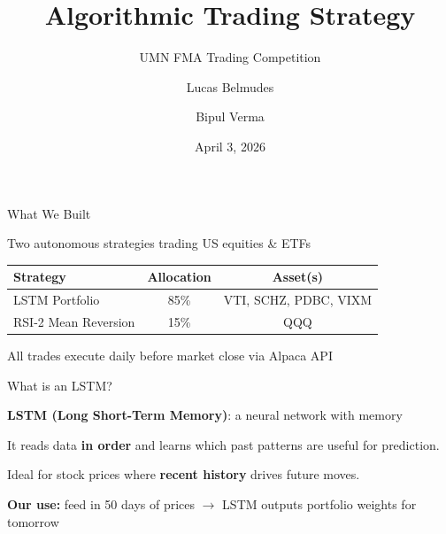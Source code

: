 \documentclass[aspectratio=169]{beamer}
\title{Algorithmic Trading Strategy}
\subtitle{UMN FMA Trading Competition}
\author{Lucas Belmudes \and Bipul Verma}
\date{April 3, 2026}
\begin{document}
\begin{frame}
\titlepage
\end{frame}

\begin{frame}{What We Built}

\Large
Two autonomous strategies trading US equities \& ETFs

\vspace{0.5cm}

\begin{table}
\centering
\large
\begin{tabular}{lcc}
\toprule
\textbf{Strategy} & \textbf{Allocation} & \textbf{Asset(s)} \\
\midrule
LSTM Portfolio & 85\% & VTI, SCHZ, PDBC, VIXM \\
RSI-2 Mean Reversion & 15\% & QQQ \\
\bottomrule
\end{tabular}
\end{table}

\vspace{0.5cm}

\large All trades execute daily before market close via Alpaca API

\end{frame}

\begin{frame}{What is an LSTM?}

\Large
\textbf{LSTM (Long Short-Term Memory)}: a neural network with memory

\vspace{0.5cm}

\large
It reads data \textbf{in order} and learns which past patterns are useful for prediction.

\vspace{0.3cm}

Ideal for stock prices where \textbf{recent history} drives future moves.

\vspace{0.5cm}

\textbf{Our use:} feed in 50 days of prices $\rightarrow$ LSTM outputs portfolio weights for tomorrow

\end{frame}
\end{document}
